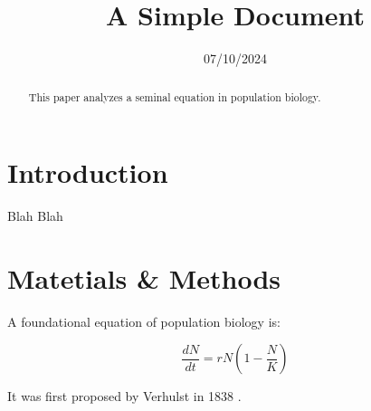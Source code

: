 \documentclass[12pt]{article}
\title{A Simple Document}
\date{07/10/2024}
\begin{document}
 \maketitle

 \begin{abstract}
    This paper analyzes a seminal equation in population biology.
 \end{abstract}

 \section{Introduction}
   Blah Blah

 \section{Matetials \& Methods}
 
 A foundational equation of population biology is:

 \begin{equation}
   \frac{dN}{dt} = r N (1 - \frac{N}{K})
 \end{equation}

 It was first proposed by Verhulst in 1838 \cite{verhulst1838notice}.

 

 
\end{document}
